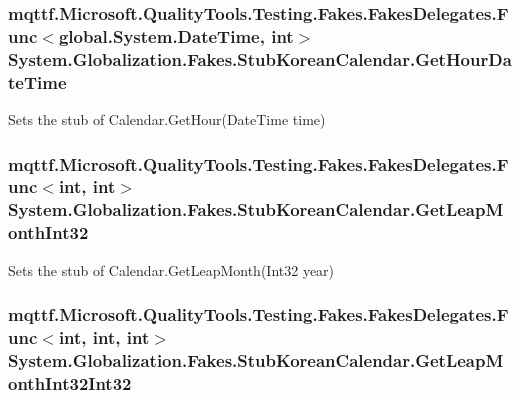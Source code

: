 \hypertarget{class_system_1_1_globalization_1_1_fakes_1_1_stub_korean_calendar_a9693635709b7bee1310fc24f4dbdf76c}{
\subsubsection[{Get\-Hour\-Date\-Time}]{\setlength{\rightskip}{0pt plus 5cm}mqttf.\-Microsoft.\-Quality\-Tools.\-Testing.\-Fakes.\-Fakes\-Delegates.\-Func$<$global.\-System.\-Date\-Time, int$>$ System.\-Globalization.\-Fakes.\-Stub\-Korean\-Calendar.\-Get\-Hour\-Date\-Time}}\label{class_system_1_1_globalization_1_1_fakes_1_1_stub_korean_calendar_a9693635709b7bee1310fc24f4dbdf76c}


Sets the stub of Calendar.\-Get\-Hour(\-Date\-Time time)

\hypertarget{class_system_1_1_globalization_1_1_fakes_1_1_stub_korean_calendar_a69e4b15b410da49df95bcc35bb71b6fd}{
\subsubsection[{Get\-Leap\-Month\-Int32}]{\setlength{\rightskip}{0pt plus 5cm}mqttf.\-Microsoft.\-Quality\-Tools.\-Testing.\-Fakes.\-Fakes\-Delegates.\-Func$<$int, int$>$ System.\-Globalization.\-Fakes.\-Stub\-Korean\-Calendar.\-Get\-Leap\-Month\-Int32}}\label{class_system_1_1_globalization_1_1_fakes_1_1_stub_korean_calendar_a69e4b15b410da49df95bcc35bb71b6fd}


Sets the stub of Calendar.\-Get\-Leap\-Month(\-Int32 year)

\hypertarget{class_system_1_1_globalization_1_1_fakes_1_1_stub_korean_calendar_a822786c0b23228c16d4ecb9941bca6e2}{
\subsubsection[{Get\-Leap\-Month\-Int32\-Int32}]{\setlength{\rightskip}{0pt plus 5cm}mqttf.\-Microsoft.\-Quality\-Tools.\-Testing.\-Fakes.\-Fakes\-Delegates.\-Func$<$int, int, int$>$ System.\-Globalization.\-Fakes.\-Stub\-Korean\-Calendar.\-Get\-Leap\-Month\-Int32\-Int32}}\label{class_system_1_1_globalization_1_1_fakes_1_1_stub_korean_calendar_a822786c0b23228c16d4ecb9941bca6e2}


